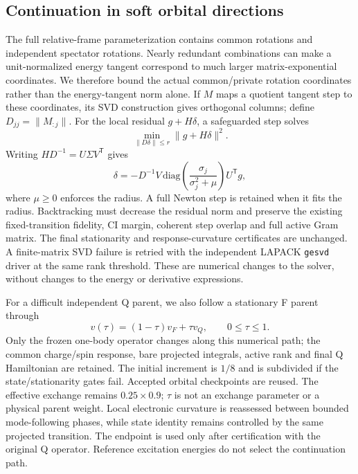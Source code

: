 \subsection{Continuation in soft orbital directions}
The full relative-frame parameterization contains common rotations and independent spectator rotations. Nearly redundant combinations can make a unit-normalized energy tangent correspond to much larger matrix-exponential coordinates. We therefore bound the actual common/private rotation coordinates rather than the energy-tangent norm alone. If $M$ maps a quotient tangent step to these coordinates, its SVD construction gives orthogonal columns; define $D_{jj}=\|M_{:j}\|$. For the local residual $g+H\delta$, a safeguarded step solves
\begin{equation}
 \min_{\|D\delta\|\leq r}\|g+H\delta\|^2.
\end{equation}
Writing $HD^{-1}=U\Sigma V^\mathsf{T}$ gives
\begin{equation}
 \delta=-D^{-1}V\,\mathrm{diag}\!\left(\frac{\sigma_j}{\sigma_j^2+\mu}\right)U^\mathsf{T}g,
\end{equation}
where $\mu\geq0$ enforces the radius. A full Newton step is retained when it fits the radius. Backtracking must decrease the residual norm and preserve the existing fixed-transition fidelity, CI margin, coherent step overlap and full active Gram matrix. The final stationarity and response-curvature certificates are unchanged. A finite-matrix SVD failure is retried with the independent LAPACK \texttt{gesvd} driver at the same rank threshold. These are numerical changes to the solver, without changes to the energy or derivative expressions.

For a difficult independent Q parent, we also follow a stationary F parent through
\begin{equation}
 v(\tau)=(1-\tau)v_F+\tau v_Q,\qquad 0\leq\tau\leq1.
\end{equation}
Only the frozen one-body operator changes along this numerical path; the common charge/spin response, bare projected integrals, active rank and final Q Hamiltonian are retained. The initial increment is $1/8$ and is subdivided if the state/stationarity gates fail. Accepted orbital checkpoints are reused. The effective exchange remains $0.25\times0.9$; $\tau$ is not an exchange parameter or a physical parent weight. Local electronic curvature is reassessed between bounded mode-following phases, while state identity remains controlled by the same projected transition. The endpoint is used only after certification with the original Q operator. Reference excitation energies do not select the continuation path.

